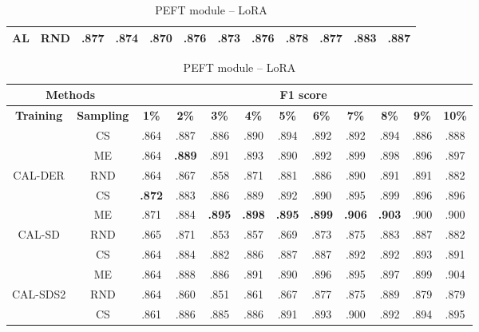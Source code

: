 \begin{table}[htbp]
\begin{subtable}{\linewidth}
\begin{tabular}{c|c|cccccccccc}
\multirow{-3}{*}{\raggedright\arraybackslash AL} & RND & .877 & .874 & .870 & .876 & .873 & .876 & .878 & .877 & .883 & .887\\
\bottomrule
\end{tabular}
\end{subtable}
\vspace{1em}
\begin{subtable}{\linewidth}
\centering
\caption{PEFT module -- LoRA}

\begin{tabular}{c|c|cccccccccc}
\toprule
\multicolumn{2}{c|}{\textbf{Methods}} & \multicolumn{10}{c}{\textbf{F1 score}} \\
\midrule
\textbf{Training} & \textbf{Sampling} & \textbf{1\%} & \textbf{2\%} & \textbf{3\%} & \textbf{4\%} & \textbf{5\%} & \textbf{6\%} & \textbf{7\%} & \textbf{8\%} & \textbf{9\%} & \textbf{10\%}\\
\midrule
 & CS & .864 & .887 & .886 & .890 & .894 & .892 & .892 & .894 & .886 & .888\\

 & ME & .864 & \textbf{.889} & .891 & .893 & .890 & .892 & .899 & .898 & .896 & .897\\

\multirow{-3}{*}{\raggedright\arraybackslash CAL-DER} & RND & .864 & .867 & .858 & .871 & .881 & .886 & .890 & .891 & .891 & .882\\
\midrule
 & CS & \textbf{.872} & .883 & .886 & .889 & .892 & .890 & .895 & .899 & .896 & .896\\

 & ME & .871 & .884 & \textbf{.895} & \textbf{.898} & \textbf{.895} & \textbf{.899} & \textbf{.906} & \textbf{.903} & .900 & .900\\

\multirow{-3}{*}{\raggedright\arraybackslash CAL-SD} & RND & .865 & .871 & .853 & .857 & .869 & .873 & .875 & .883 & .887 & .882\\
\midrule
 & CS & .864 & .884 & .882 & .886 & .887 & .887 & .892 & .892 & .893 & .891\\

 & ME & .864 & .888 & .886 & .891 & .890 & .896 & .895 & .897 & .899 & .904\\

\multirow{-3}{*}{\raggedright\arraybackslash CAL-SDS2} & RND & .864 & .860 & .851 & .861 & .867 & .877 & .875 & .889 & .879 & .879\\
\midrule
 & CS & .861 & .886 & .885 & .886 & .891 & .893 & .900 & .892 & .894 & .895\\


\end{tabular}
\end{subtable}
\end{table}
